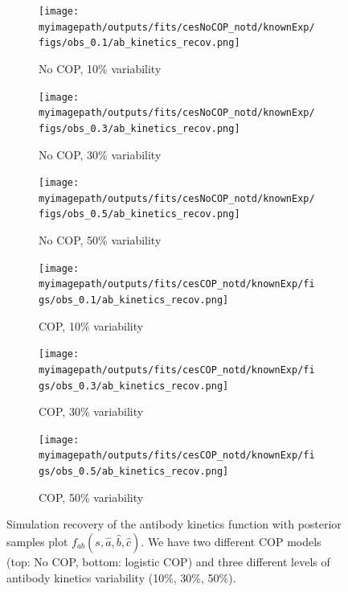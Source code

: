 \begin{figure}[H]
    \centering
    \begin{subfigure}{0.31\textwidth}
        \centering
        \texttt{[image: \\myimagepath/outputs/fits/cesNoCOP\_notd/knownExp/figs/obs\_0.1/ab\_kinetics\_recov.png]}
        \caption{No COP, 10\% variability}
    \end{subfigure}
    \begin{subfigure}{0.31\textwidth}
        \centering
        \texttt{[image: \\myimagepath/outputs/fits/cesNoCOP\_notd/knownExp/figs/obs\_0.3/ab\_kinetics\_recov.png]}
        \caption{No COP, 30\% variability}
    \end{subfigure}
    \begin{subfigure}{0.31\textwidth}
        \centering
        \texttt{[image: \\myimagepath/outputs/fits/cesNoCOP\_notd/knownExp/figs/obs\_0.5/ab\_kinetics\_recov.png]}
        \caption{No COP, 50\% variability}
    \end{subfigure}
    
  \begin{subfigure}{0.31\textwidth}
        \centering
        \texttt{[image: \\myimagepath/outputs/fits/cesCOP\_notd/knownExp/figs/obs\_0.1/ab\_kinetics\_recov.png]}
        \caption{ COP, 10\% variability}
    \end{subfigure}
    \begin{subfigure}{0.31\textwidth}
        \centering
        \texttt{[image: \\myimagepath/outputs/fits/cesCOP\_notd/knownExp/figs/obs\_0.3/ab\_kinetics\_recov.png]}
        \caption{ COP, 30\% variability}
    \end{subfigure}
    \begin{subfigure}{0.31\textwidth}
        \centering
        \texttt{[image: \\myimagepath/outputs/fits/cesCOP\_notd/knownExp/figs/obs\_0.5/ab\_kinetics\_recov.png]}
        \caption{ COP, 50\% variability}
    \end{subfigure}
    
    \caption{Simulation recovery of the antibody kinetics function with posterior samples plot $f_{ab}(s, \hat{a}, \hat{b}, \hat{c})$. We have two different COP models (top: No COP, bottom: logistic COP) and three different levels of antibody kinetics variability (10\%, 30\%, 50\%). \label{fit1:ab}
}

\end{figure}

